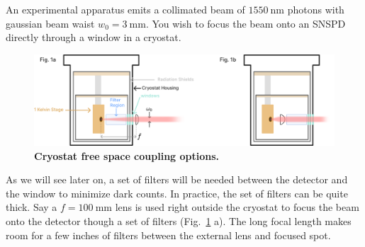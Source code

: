 \documentclass[11pt]{caltech_thesis} %
\begin{document}
An experimental apparatus emits a collimated beam of $1550~\mathrm{nm}$ photons with gaussian beam waist $w_0 = 3~\mathrm{mm}$. You wish to focus the beam onto an SNSPD directly through a window in a cryostat.

\hypertarget{fig:cryostat_concept}{%
\begin{figure}
\centering
\includegraphics{./chapter_07/figs/fig1b_light.pdf}
\caption[{Cryostat optical coupling}]{\textbf{Cryostat free space coupling options.}}
\label{fig:cryostat_concept}
\end{figure}
}

As we will see later on, a set of filters will be needed between the detector and the window to minimize dark counts. In practice, the set of filters can be quite thick. Say a $f = 100~\mathrm{mm}$ lens is used right outside the cryostat to focus the beam onto the detector though a set of filters (Fig.~\ref{fig:cryostat_concept} a). The long focal length makes room for a few inches of filters between the external lens and focused spot.
\end{document}
